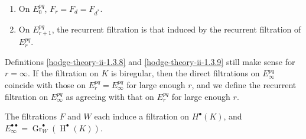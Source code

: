     
 \begin{enumerate}
      
 \item[(i)]
        On \(E_0^{pq}\), \(F_r=F_d=F_{d^*}\).
      

      
 \item[(ii)]
        On \(E_{r+1}^{pq}\), the recurrent filtration is that induced by the recurrent filtration of \(E_r^{pq}\).
      

    \end{enumerate}\label{hodge-theory-ii-1.3.12}\par{}Definitions \cref{hodge-theory-ii-1.3.8} and \cref{hodge-theory-ii-1.3.9} still make sense for \(r=\infty \).
    If the filtration on \(K\) is biregular, then the direct filtrations on \(E_\infty ^{pq}\) coincide with those on \(E_r^{pq}=E_\infty ^{pq}\) for large enough \(r\), and we define the recurrent filtration on \(E_\infty ^{pq}\) as agreeing with that on \(E_r^{pq}\) for large enough \(r\).\par{}The filtrations \(F\) and \(W\) each induce a filtration on \(H^\bullet (K)\), and \(E_\infty ^{\bullet \bullet }=\operatorname {Gr}_W^\bullet (\operatorname {H}^\bullet (K))\).
